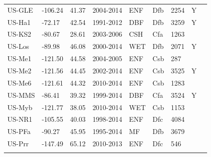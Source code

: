 \documentclass[gmd, manuscript]{copernicus}
\begin{document}
\begin{table}[t]
\begin{tabular}{lllllllll}
  US-GLE & -106.24 & 41.37 & 2004-2014 & ENF & Dfb & 2254 & Y & \citet{US-GLE} \\ 
  US-Ha1 & -72.17 & 42.54 & 1991-2012 & DBF & Dfb & 3259 & Y & \citet{US-Ha1} \\ 
  US-KS2 & -80.67 & 28.61 & 2003-2006 & CSH & Cfa & 1263 &  & \citet{US-KS2} \\ 
  US-Los & -89.98 & 46.08 & 2000-2014 & WET & Dfb & 2071 & Y & \citet{US-Los} \\ 
  US-Me1 & -121.50 & 44.58 & 2004-2005 & ENF & Csb & 287 &  & \citet{US-Me1} \\ 
  US-Me2 & -121.56 & 44.45 & 2002-2014 & ENF & Csb & 3525 & Y & \citet{US-Me2} \\ 
  US-Me6 & -121.61 & 44.32 & 2010-2014 & ENF & Csb & 1283 &  & \citet{US-Me6} \\ 
  US-MMS & -86.41 & 39.32 & 1999-2014 & DBF & Cfa & 3524 & Y & \citet{US-MMS} \\ 
  US-Myb & -121.77 & 38.05 & 2010-2014 & WET & Csb & 1153 &  & \citet{US-Myb} \\ 
  US-NR1 & -105.55 & 40.03 & 1998-2014 & ENF & Dfc & 4084 &  & \citet{US-NR1} \\ 
  US-PFa & -90.27 & 45.95 & 1995-2014 & MF & Dfb & 3679 &  & \citet{US-PFa} \\ 
  US-Prr & -147.49 & 65.12 & 2010-2013 & ENF & Dfc & 546 &  & \citet{US-Prr} \\ 
    \bottomhline
\end{tabular}
\label{tab:sites3}
\end{table}
\clearpage
\end{document}
